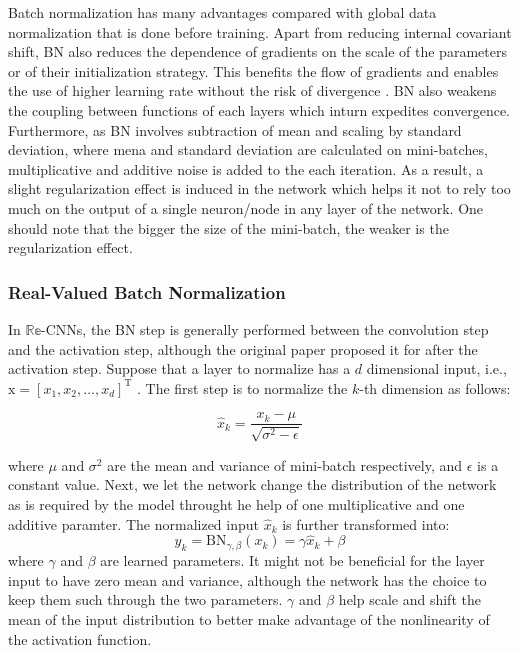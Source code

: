 Batch normalization has many advantages compared with global data
normalization that is done before training. Apart from reducing internal covariant shift, BN also reduces the dependence of gradients on the scale of the parameters or of their initialization strategy. This benefits the flow of gradients and enables the use of higher learning rate without the risk of divergence \cite{recent_advances}. BN also weakens the coupling between functions of each layers which inturn expedites convergence.  
Furthermore, as BN involves subtraction of mean and scaling by standard deviation, where mena and standard deviation are calculated on mini-batches, multiplicative and additive noise is added to the each iteration. As a result, a slight regularization effect is induced in the network which helps it not to rely too much on the output of a single neuron/node in any layer of the network. One should note that the bigger the size of the mini-batch, the weaker is the regularization effect. 

 \subsubsection{Real-Valued Batch Normalization}\label{rvbn}
In $\mathbb{Re}$-CNNs, the BN step is generally performed between the convolution step and the activation step, although the original paper \cite{bnIoffeS15} proposed it for after the activation step. Suppose that a layer to normalize has a $d$ dimensional
input, i.e., $\mathrm{x} = [x_{1} , x_{2} , ..., x_{d} ]^{\mathrm{T}}$ .  The first step is to normalize the $k$-th dimension as follows:


 \begin{equation}
\hat{x}_{k} = \frac{x_{k} - \mu}{\sqrt{\sigma^{2} - \epsilon}}
\label{eqrbn1}
\end{equation}

where $\mu$ and $\sigma^{2}$ are the mean and variance of mini-batch respectively, and $\epsilon$ is a constant value. Next, we let the network change the distribution of the network as is required by the model throught he help of one multiplicative and one additive paramter. The normalized input $\hat{x}_{k}$ is further transformed into:
 \begin{equation}
y_{k} = \mathrm{BN}_{\gamma,\beta}(x_{k}) = \gamma\hat{x}_{k} + \beta
\label{eqrbn2}
\end{equation}
where $\gamma$ and $\beta$ are learned parameters. It might not be beneficial for the layer input to have zero mean and variance, although the network has the choice to keep them such through the two parameters. $\gamma$ and $\beta$ help scale and shift the mean of the input distribution to better make advantage of the nonlinearity of the activation function.


